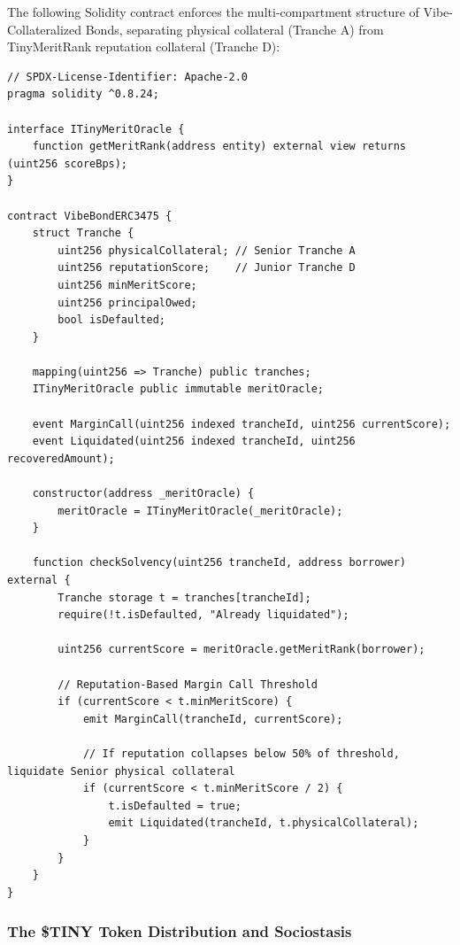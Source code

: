 \documentclass[a4paper,11pt,twoside,parskip=half-,headings=small]{scrartcl}
\newcommand{\code}[1]{\texttt{#1}}
\begin{document}
The following Solidity contract enforces the multi-compartment structure of
Vibe-Collateralized Bonds, separating physical collateral (Tranche A) from
TinyMeritRank reputation collateral (Tranche D):

\begin{lstlisting}[language=Solidity,caption={Solidity Implementation: ERC-3475 Vibe-Collateralized Bond (\code{contracts/src/VibeBondERC3475.sol})}]
// SPDX-License-Identifier: Apache-2.0
pragma solidity ^0.8.24;

interface ITinyMeritOracle {
    function getMeritRank(address entity) external view returns (uint256 scoreBps);
}

contract VibeBondERC3475 {
    struct Tranche {
        uint256 physicalCollateral; // Senior Tranche A
        uint256 reputationScore;    // Junior Tranche D
        uint256 minMeritScore;
        uint256 principalOwed;
        bool isDefaulted;
    }

    mapping(uint256 => Tranche) public tranches;
    ITinyMeritOracle public immutable meritOracle;

    event MarginCall(uint256 indexed trancheId, uint256 currentScore);
    event Liquidated(uint256 indexed trancheId, uint256 recoveredAmount);

    constructor(address _meritOracle) {
        meritOracle = ITinyMeritOracle(_meritOracle);
    }

    function checkSolvency(uint256 trancheId, address borrower) external {
        Tranche storage t = tranches[trancheId];
        require(!t.isDefaulted, "Already liquidated");

        uint256 currentScore = meritOracle.getMeritRank(borrower);

        // Reputation-Based Margin Call Threshold
        if (currentScore < t.minMeritScore) {
            emit MarginCall(trancheId, currentScore);
            
            // If reputation collapses below 50% of threshold, liquidate Senior physical collateral
            if (currentScore < t.minMeritScore / 2) {
                t.isDefaulted = true;
                emit Liquidated(trancheId, t.physicalCollateral);
            }
        }
    }
}
\end{lstlisting}

\subsubsection{The \$TINY Token Distribution and Sociostasis}
\end{document}
